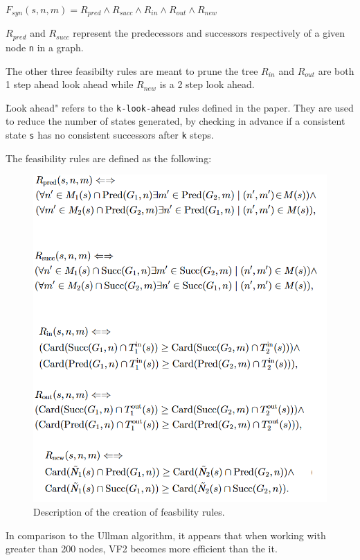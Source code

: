 \documentclass{article}
\begin{document}
  $F_{syn}(s,n,m) = R_{pred} \land R_{succ} \land R_{in} \land R_{out} \land R_{new}$

  $R_{pred}$ and $R_{succ}$ represent the predecessors and successors respectively of a given node \texttt{n}  in a graph.

  The other three feasibilty rules are meant to prune the tree
  $R_{in}$ and $R_{out}$ are both 1 step ahead look ahead while $R_{new}$ is a 2 step look ahead.

  \"Look ahead" refers to the \texttt{k-look-ahead} rules defined in the paper. They are used to reduce the number of states generated, by checking in advance if a consistent state \texttt{s} has no consistent successors after \texttt{k} steps.

  The feasibility rules are defined as the following:

  \begin{figure}[H]
    \centering
    \includegraphics{images/vf2_algo.png}
    \caption{Description of the creation of feasbility rules.}
    \label{fuckyou}
  \end{figure}

  In comparison to the Ullman algorithm, it appears that when working with greater than 200 nodes, VF2 becomes more efficient than the it.
\end{document}
